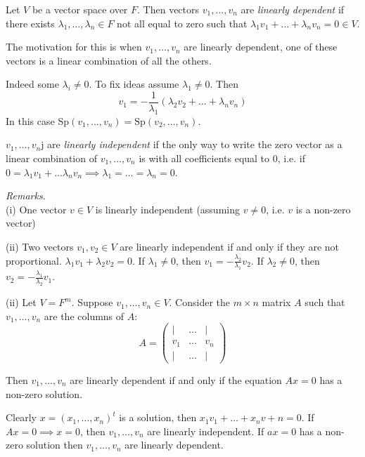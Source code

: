 \documentclass[10pt]{scrartcl}
\begin{document}
\begin{definition} 
Let $V$ be a vector space over $F$. Then vectors $v_1,\dots,v_n$ are \emph{linearly dependent} if there exists $\lambda_1,\dots,\lambda_n \in F$ not all equal to zero such that $\lambda_1v_1 + \dots + \lambda_nv_n = 0 \in V$.
\end{definition}

The motivation for this is when $v_1,\dots,v_n$ are linearly dependent, one of these vectors is a linear combination of all the others.

Indeed some $\lambda_i \neq 0$. To fix ideas assume $\lambda_1 \neq 0$. Then 
\[
  v_1 = -\frac{1}{\lambda_1}(\lambda_2v_2 + \dots + \lambda_nv_n)
\]
In this case Sp$(v_1,\dots,v_n) = \mathrm{Sp}(v_2,\dots,v_n)$. \\

\begin{definition}
$v_1,\dots,v_n$j are \emph{linearly independent} if the only way to write the zero vector as a linear combination of $v_1,\dots,v_n$ is with all coefficients equal to $0$, i.e. if $0 = \lambda_1v_1 + \dots\lambda_nv_n \implies \lambda_1 = \dots = \lambda_n = 0$. 
\end{definition}\vsp

\emph{Remarks.}~\\[.1cm]
(i) One vector $v \in V$ is linearly independent (assuming $v \neq 0$, i.e. $v$ is a non-zero vector)

(ii) Two vectors $v_1,v_2 \in V$ are linearly independent if and only if they are not proportional. $\lambda_1v_1 + \lambda_2v_2 = 0$. If $\lambda_1 \neq 0$, then $v_1 = -\frac{\lambda_2}{\lambda_1}v_2.$ If $\lambda_2 \neq 0$, then $v_2 = -\frac{\lambda_1}{\lambda_2}v_1$. 

(ii) Let $V = F^m$. Suppose $v_1,\dots,v_n \in V$. Consider the $m \times n$ matrix $A$ such that $v_1,\dots,v_n$ are the columns of $A$:
\[
  A = \begin{pmatrix}
 | & \dots & |\\
 v_1 & \dots & v_n\\
 | & \dots & |	
 \end{pmatrix}
\]

Then $v_1,\dots,v_n$ are linearly dependent if and only if the equation $Ax = 0$ has a non-zero solution. 

Clearly $x = (x_1,\dots,x_n)^t$ is a solution, then $x_1v_1 + \dots + x_n v+n = 0$. If $Ax = 0 \implies x = 0$, then $v_1,\dots,v_n$ are linearly independent. If $ax = 0$ has a non-zero solution then $v_1,\dots,v_n$ are linearly dependent.\\
\end{document}
